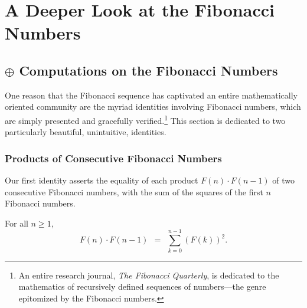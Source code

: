
\chapter{A Deeper Look at the Fibonacci Numbers}
\label{ch:FIBO-enrich}

\section{$\oplus$ Computations on the Fibonacci Numbers}
\label{sec:FIBO-enrich-ops}

One reason that the Fibonacci sequence has captivated an entire mathematically oriented community are the myriad identities involving Fibonacci numbers, which are simply presented and gracefully verified.\footnote{An entire research journal, {\it The Fibonacci Quarterly}, is dedicated to the mathematics of recursively defined sequences of numbers---the genre epitomized by the Fibonacci numbers.}  This section is dedicated to two particularly beautiful,  unintuitive, identities.

\subsection{Products of Consecutive Fibonacci Numbers}
\label{sec:product-Fn-Fn+1}

Our first identity asserts the equality of each product $F(n) \cdot F(n-1)$ of two consecutive Fibonacci numbers, with the sum of the squares of the first $n$ Fibonacci numbers.

\begin{prop} 
\label{thm:FiboSumConsecutive}
For all $n \geq 1$,
\begin{equation}
\label{eq:FiboSumConsecutive}
F(n) \cdot F(n-1) \ \ = \ \ \sum_{k=0}^{n-1} (F(k))^2.
\end{equation}
\end{prop}


